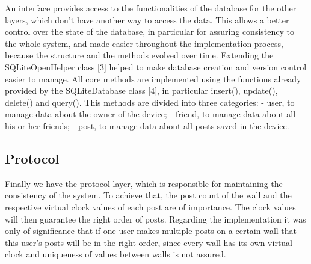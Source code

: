 \documentclass{report}
\begin{document}

An interface provides access to the functionalities of the database for the other layers, which don't have another way to access the data. This allows a better control over the state of the database, in particular for assuring consistency to the whole system, and made easier throughout the implementation process, because the structure and the methods evolved over time.
Extending the SQLiteOpenHelper class [3] helped to make database creation and version control easier to manage.
All core methods are implemented using the functions already provided by the SQLiteDatabase class [4], in particular insert(), update(), delete() and query(). This methods are divided into three categories:
- user, to manage data about the owner of the device;
- friend, to manage data about all his or her friends;
- post, to manage data about all posts saved in the device.

\subsection{Protocol}

Finally we have the protocol layer, which is responsible for maintaining the consistency of the system. To achieve that, the post count of the wall and the respective virtual clock values of each post are of importance. The clock values will then guarantee the right order of posts. Regarding the implementation it was only of significance that if one user makes multiple posts on a certain wall that this user's posts will be in the right order, since every wall has its own virtual clock and uniqueness of values between walls is not assured.
\end{document}
